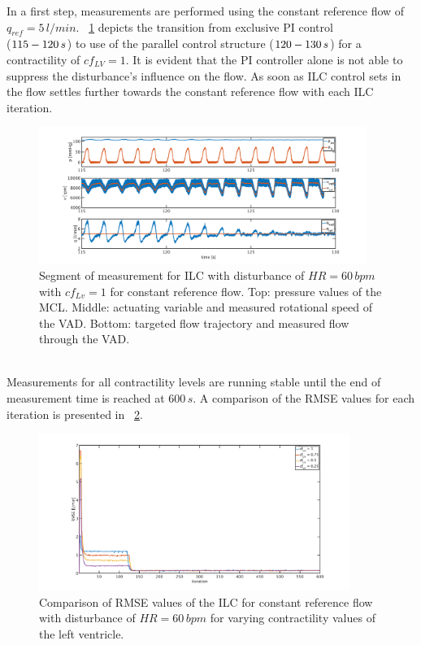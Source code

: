 In a first step, measurements are performed using the constant reference flow of $q_{ref}=5\,l/min$. \figurename~\ref{fig:pi_to_ilc_dist_const_cf1} depicts the transition from exclusive PI control \\($115 \-- 120\,s$) to use of the parallel control structure ($120\--130\,s$) for a contractility of $cf_{LV}=1$. It is evident that the PI controller alone is not able to suppress the disturbance's influence on the flow. As soon as ILC control sets in the flow settles further towards the constant reference flow with each ILC iteration.
\begin{figure}[ht!]
  \centering
  \includegraphics[width=0.95\textwidth]{images/chapt_5/ILC/pi_to_ilc_dist_const_cf1.pdf}
  \caption[Segment of measurement for ILC with disturbance of $HR=60\,bpm$ with $cf_{Lv}=1$ for constant reference flow]{Segment of measurement for ILC with disturbance of $HR=60\,bpm$ with $cf_{Lv}=1$ for constant reference flow. Top:  pressure values of the MCL. Middle: actuating variable and measured rotational speed of the VAD. Bottom: targeted flow trajectory and measured flow through the VAD.}
  \label{fig:pi_to_ilc_dist_const_cf1}
\end{figure}
\\Measurements for all contractility levels are running stable until the end of measurement time is reached at $600\,s$. A comparison of the RMSE values for each iteration is presented in \figurename~\ref{fig:RMSE_dist_const_5_var_cf}.
\begin{figure}[ht]
  \centering
  \includegraphics[width=0.9\textwidth]{images/chapt_5/ILC/RMSE_dist_const_5_var_cf.pdf}
  \caption[RMSE Comparison of ILC at constant reference flow for varying left ventricular contractilities]{Comparison of RMSE values of the ILC for constant reference flow with disturbance of $HR=60\,bpm$ for varying contractility values of the left ventricle.}
  \label{fig:RMSE_dist_const_5_var_cf}
\end{figure}


